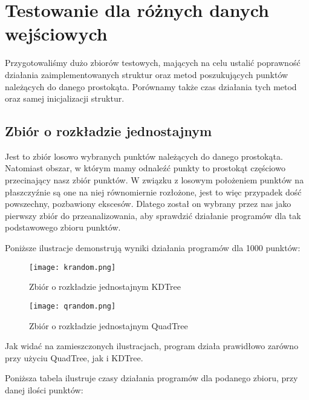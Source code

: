 \documentclass[a4paper, 12pt]{article}
\begin{document}
  \section{Testowanie dla różnych danych wejściowych}
    \quad Przygotowaliśmy dużo zbiorów testowych, mających na celu ustalić poprawność działania zaimplementowanych struktur oraz metod poszukujących punktów należących do danego prostokąta. Porównamy także czas działania tych metod oraz samej inicjalizacji struktur. 

    \subsection{Zbiór o rozkładzie jednostajnym}
      \quad Jest to zbiór losowo wybranych punktów należących do danego prostokąta. Natomiast obszar, w którym mamy odnaleźć punkty to prostokąt częściowo przecinający nasz zbiór punktów. W związku z losowym położeniem punktów na płaszczyźnie są one na niej równomiernie rozłożone, jest to więc przypadek dość powszechny, pozbawiony ekscesów. Dlatego został on wybrany przez nas jako pierwszy zbiór do przeanalizowania, aby sprawdzić działanie programów dla tak podstawowego zbioru punktów. 

      \noindent
      \quad Poniższe ilustracje demonstrują wyniki działania programów dla 1000 punktów:

      \newpage
      \begin{figure}[h!]
      \centering
        \texttt{[image: krandom.png]}
        \caption{Zbiór o rozkładzie jednostajnym KDTree}
      \end{figure}

      \begin{figure}[h!]
      \centering
        \texttt{[image: qrandom.png]}
        \caption{Zbiór o rozkładzie jednostajnym QuadTree}
      \end{figure}

      \noindent
      \quad Jak widać na zamieszczonych ilustracjach, program działa prawidłowo zarówno przy użyciu QuadTree, jak i KDTree. 

      \noindent
      \quad Poniższa tabela ilustruje czasy działania programów dla podanego zbioru, przy danej ilości punktów:
\end{document}
